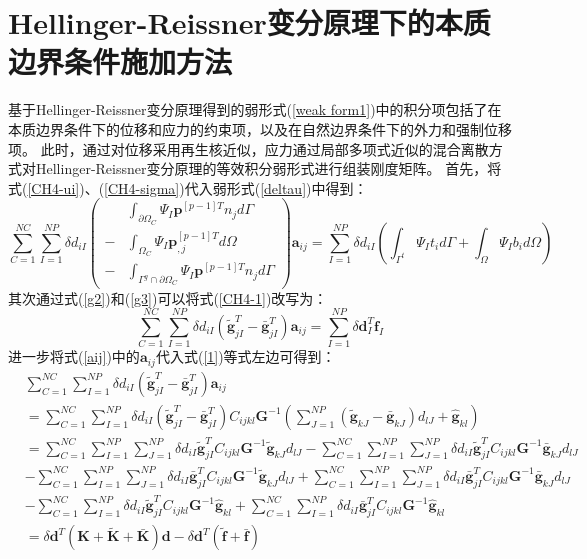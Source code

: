 \section{Hellinger-Reissner变分原理下的本质边界条件施加方法}
基于Hellinger-Reissner变分原理得到的弱形式(\ref{weak form1})中的积分项包括了在本质边界条件下的位移和应力的约束项，以及在自然边界条件下的外力和强制位移项。
此时，通过对位移采用再生核近似，应力通过局部多项式近似的混合离散方式对Hellinger-Reissner变分原理的等效积分弱形式进行组装刚度矩阵。
首先，将式(\ref{CH4-ui})、(\ref{CH4-sigma})代入弱形式(\ref{deltau})中得到：
\begin{equation}\label{CH4-1}
\sum_{C=1}^{N\!C}\sum_{I=1}^{N\!P}\delta d_{iI} \left (
        \begin{split}
        &\int_{\partial\Omega_C}\Psi_I\pmb{p}^{[p-1]T}n_jd\Gamma \\
        -&\int_{\Omega_C}\Psi_I\pmb{p}_{,j}^{[p-1]T}d\Omega \\
        -&\int_{\Gamma^g\cap\partial\Omega_C}\Psi_I\pmb{p}^{[p-1]T}n_jd\Gamma
        \end{split}
        \right )\pmb{a}_{ij}=
\sum_{I=1}^{N\!P}\delta d_{iI}(\int_{\Gamma^t}\Psi_It_id\Gamma+\int_{\Omega}\Psi_Ib_id\Omega)
\end{equation}
其次通过式(\ref{g2})和(\ref{g3})可以将式(\ref{CH4-1})改写为：
\begin{equation}\label{1}
    \sum_{C=1}^{N\!C}\sum_{I=1}^{N\!P}\delta d_{iI}(\tilde{\pmb g}_{jI}^T-\bar{\pmb g}_{jI}^T)\pmb{a}_{ij}=\sum_{I=1}^{N\!P}\delta\pmb{d}_I^T\pmb{f}_I
\end{equation}
进一步将式(\ref{aij})中的$\pmb{a}_{ij}$代入式(\ref{1})等式左边可得到：
\begin{equation}\label{inference}
\begin{split}
    &\sum_{C=1}^{N\!C}\sum_{I=1}^{N\!P}\delta d_{iI}(\tilde{\pmb g}_{jI}^T-\bar{\pmb g}_{jI}^T)\pmb{a}_{ij}\\
    &=\sum_{C=1}^{N\!C}\sum_{I=1}^{N\!P}\delta d_{iI}(\tilde{\pmb g}_{jI}^T-\bar{\pmb g}_{jI}^T)C_{ijkl}\pmb{G}^{-1}(\sum_{J=1}^{N\!P}(\tilde{\pmb g}_{kJ}-\bar{\pmb g}_{kJ})d_{lJ}+\hat{\pmb g}_{kl})\\
    &=\sum_{C=1}^{N\!C}\sum_{I=1}^{N\!P}\sum_{J=1}^{N\!P}\delta d_{iI}\tilde{\pmb g}^T_{jI}C_{ijkl}\pmb{G}^{-1}\tilde{\pmb g}_{kJ}d_{lJ}
    -\sum_{C=1}^{N\!C}\sum_{I=1}^{N\!P}\sum_{J=1}^{N\!P}\delta d_{iI}\tilde{\pmb g}^T_{jI}C_{ijkl}\pmb{G}^{-1}\bar{\pmb g}_{kJ}d_{lJ}\\
    &-\sum_{C=1}^{N\!C}\sum_{I=1}^{N\!P}\sum_{J=1}^{N\!P}\delta d_{iI}\bar{\pmb g}^T_{jI}C_{ijkl}\pmb{G}^{-1}\tilde{\pmb g}_{kJ}d_{lJ}
    +\sum_{C=1}^{N\!C}\sum_{I=1}^{N\!P}\sum_{J=1}^{N\!P}\delta d_{iI}\bar{\pmb g}^T_{jI}C_{ijkl}\pmb{G}^{-1}\bar{\pmb g}_{kJ}d_{lJ}\\
    &-\sum_{C=1}^{N\!C}\sum_{I=1}^{N\!P}\delta d_{iI}\tilde{\pmb g}_{jI}^TC_{ijkl}\pmb{G}^{-1}\hat{\pmb g}_{kl}
    +\sum_{C=1}^{N\!C}\sum_{I=1}^{N\!P}\delta d_{iI}\bar{\pmb g}_{jI}^TC_{ijkl}\pmb{G}^{-1}\hat{\pmb g}_{kl}\\
    &=\delta\pmb{d}^T(\pmb K+\tilde{\pmb K}+\bar{\pmb K})\pmb{d}-\delta\pmb{d}^T(\tilde{\pmb f}+\bar{\pmb f})
\end{split}
\end{equation}
